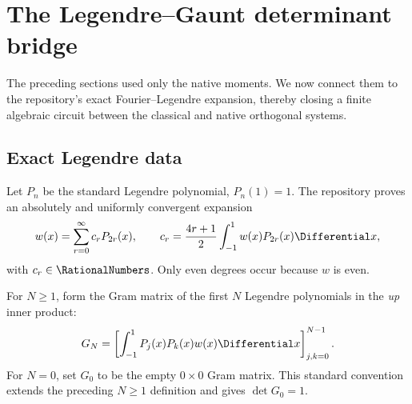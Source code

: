 \documentclass[11pt,oneside]{article}
\theoremstyle{definition}
\theoremstyle{remark}
\numberwithin{equation}{section}
\begin{document}
\section{The Legendre--Gaunt determinant bridge}
\label{sec:legendre-gaunt}

The preceding sections used only the native moments.  We now connect them to
the repository's exact Fourier--Legendre expansion, thereby closing a finite
algebraic circuit between the classical and native orthogonal systems.

\subsection{Exact Legendre data}
Let $P_n$ be the standard Legendre polynomial, $P_n(1)=1$.  The repository
proves an absolutely and uniformly convergent expansion
\begin{equation}
 w(x)=\sum_{r=0}^{\infty}c_rP_{2r}(x),
 \qquad
 c_r=\frac{4r+1}{2}\int_{-1}^{1}w(x)P_{2r}(x)\Differential x,
 \label{eq:up-legendre-series}
\end{equation}
with $c_r\in\RationalNumbers$.  Only even degrees occur because $w$ is even.

For $N\ge1$, form the Gram matrix of the first $N$ Legendre polynomials in the
\emph{up} inner product:
\begin{equation}
 G_N=\left[
  \int_{-1}^{1}P_j(x)P_k(x)w(x)\Differential x
 \right]_{j,k=0}^{N-1}.
 \label{eq:legendre-gram}
\end{equation}
For $N=0$, set $G_0$ to be the empty $0\mathbin{\times}0$ Gram matrix.  This
standard convention extends the preceding $N\ge1$ definition and gives
$\det G_0=1$.
\end{document}
